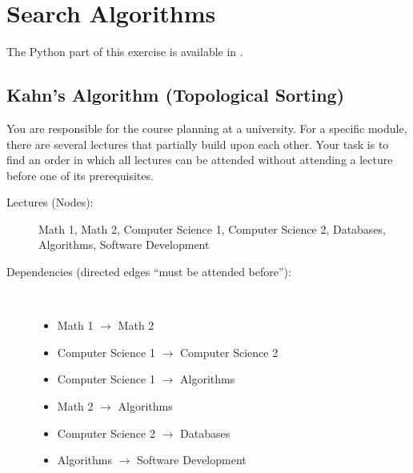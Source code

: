 \section{Search Algorithms}

The Python part of this exercise is available in .

\subsection*{Kahn's Algorithm (Topological Sorting)}

You are responsible for the course planning at a university. For a specific module, there are several lectures that partially build upon each other. Your task is to find an order in which all lectures can be attended without attending a lecture before one of its prerequisites.
\begin{description}
    \item[Lectures (Nodes):] Math 1, Math 2, Computer Science 1, Computer Science 2, Databases, Algorithms, Software Development
    \item[Dependencies (directed edges ``must be attended before''):]~
    \begin{itemize}
        \item Math 1 $\rightarrow$ Math 2
        \item Computer Science 1 $\rightarrow$ Computer Science 2
        \item Computer Science 1 $\rightarrow$ Algorithms
        \item Math 2 $\rightarrow$ Algorithms
        \item Computer Science 2 $\rightarrow$ Databases
        \item Algorithms $\rightarrow$ Software Development
    \end{itemize}
\end{description}

